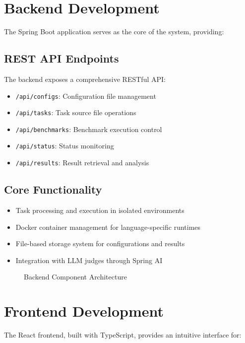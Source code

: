 \section{Backend Development}

The Spring Boot application serves as the core of the system, providing:

\subsection{REST API Endpoints}
The backend exposes a comprehensive RESTful API:
\begin{itemize}
    \item \texttt{/api/configs}: Configuration file management
    \item \texttt{/api/tasks}: Task source file operations
    \item \texttt{/api/benchmarks}: Benchmark execution control
    \item \texttt{/api/status}: Status monitoring
    \item \texttt{/api/results}: Result retrieval and analysis
\end{itemize}

\subsection{Core Functionality}
\begin{itemize}
    \item Task processing and execution in isolated environments
    \item Docker container management for language-specific runtimes
    \item File-based storage system for configurations and results
    \item Integration with LLM judges through Spring AI
\end{itemize}

\begin{figure}[h]
    \centering
    \caption{Backend Component Architecture}
    \label{fig:backend-arch}
\end{figure}

\section{Frontend Development}

The React frontend, built with TypeScript, provides an intuitive interface for:

